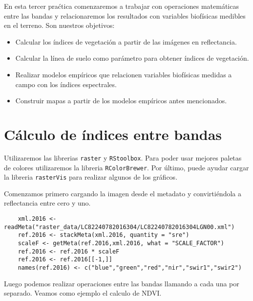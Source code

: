En esta tercer pra\'ctica comenzaremos a trabajar con operaciones matem\'aticas
entre las bandas y relacionaremos los resultados con variables biof\'isicas medibles en el terreno. Son
nuestros objetivos:

\begin{itemize}
    \item Calcular los \'indices de vegetaci\'on a partir de las im\'agenes en
        reflectancia.
    \item Calcular la l\'inea de suelo como par\'ametro para obtener \'indices
        de vegetaci\'on.
    \item Realizar modelos emp\'iricos que relacionen variables biof\'isicas
        medidas a campo con los \'indices espectrales.
    \item Construir mapas a partir de los modelos emp\'iricos antes mencionados.
\end{itemize}


\section{C\'alculo de \'indices entre bandas}
Utilizaremos las librerias \texttt{raster} y \texttt{RStoolbox}. Para
poder usar mejores paletas de colores utilizaremos la libreria
\texttt{RColorBrewer}. Por \'ultimo, puede ayudar cargar la libreria \texttt{rasterVis}
para realizar algunos de los gr\'aficos.

Comenzamos primero cargando la imagen desde el metadato y convirti\'endola a
reflectancia entre cero y uno.

\begin{lstlisting}
    xml.2016 <- readMeta("raster_data/LC82240782016304/LC82240782016304LGN00.xml")
    ref.2016 <- stackMeta(xml.2016, quantity = "sre")
    scaleF <- getMeta(ref.2016,xml.2016, what = "SCALE_FACTOR")
    ref.2016 <- ref.2016 * scaleF
    ref.2016 <- ref.2016[[-1,]]
    names(ref.2016) <- c("blue","green","red","nir","swir1","swir2")
\end{lstlisting}

Luego podemos realizar operaciones entre las bandas llamando
a cada una por separado. Veamos como ejemplo el calculo de NDVI\@.

